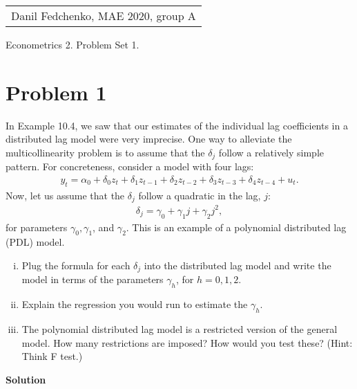 \documentclass[a4paper]{article}
\begin{document}
	\begin{flushright}
	\begin{tabular}{r}
		Danil Fedchenko, MAE 2020, group A \\
	\end{tabular}
\end{flushright}


\begin{center}
	Econometrics 2. Problem Set 1.
\end{center}
\section*{Problem 1}
 In Example 10.4, we saw that our estimates of the individual lag coefficients in a distributed lag model were very imprecise. One way to alleviate the multicollinearity problem is to assume that the $\delta_j$ follow a relatively simple pattern. For concreteness, consider a model with four lags:
 \begin{align*}
y_t = \alpha_0 + \delta_0z_t + \delta_1 z_{t-1} + \delta_2 z_{t-2} + \delta_3 z_{t-3} + \delta_4 z_{t-4}+ u_t.
\end{align*} 
Now, let us assume that the $\delta_j$ follow a quadratic in the lag, $j$: 
\begin{align*}
\delta_j = \gamma_0 + \gamma_1 j + \gamma_2 j^2,
\end{align*}
for parameters $\gamma_0, \gamma_1$, and $\gamma_2$. This is an example of a polynomial distributed lag (PDL) model. 
\begin{enumerate}[(i)]
	\item  Plug the formula for each $\delta_j$ into the distributed lag model and write the model in terms of the parameters $\gamma_h$, for $h = 0,1,2$. 
	\item Explain the regression you would run to estimate the $\gamma_h$. 
	\item The polynomial distributed lag model is a restricted version of the general model. How many restrictions are imposed? How would you test these? (Hint: Think F test.)
\end{enumerate}


\textbf{Solution}
\end{document}
